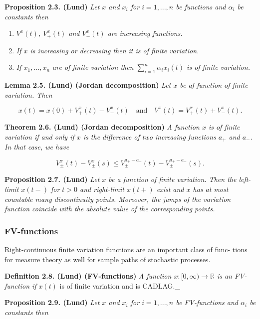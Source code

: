 \documentclass[a4paper,10pt,openany]{book}
\providecommand{\tightlist}{%
 \setlength{\itemsep}{0pt}\setlength{\parskip}{0pt}}
\begin{document}
\textbf{Proposition 2.3. (Lund)} \emph{Let \(x\) and \(x_i\) for \(i=1,...,n\) be functions and \(\alpha_i\) be constants then}

\begin{enumerate}
\def\labelenumi{\roman{enumi})}
\tightlist
\item
  \emph{\(V^x(t)\), \(V^x_+(t)\) and \(V^x_-(t)\) are increasing functions.}
\item
  \emph{If \(x\) is increasing or decreasing then it is of finite variation.}
\item
  \emph{If \(x_1,...,x_n\) are of finite variation then \(\sum_{i=1}^n\alpha_ix_i(t)\) is of finite variation.}
\end{enumerate}

\textbf{Lemma 2.5. (Lund) (Jordan decomposition)} \emph{Let \(x\) be af function of finite variation. Then}

\[
x(t)=x(0)+V_+^x(t)-V_-^x(t)\quad\text{and}\quad V^x(t)=V_+^x(t)+V_-^x(t).
\]

\textbf{Theorem 2.6. (Lund) (Jordan decomposition)} \emph{A function \(x\) is of finite variation if and only if \(x\) is the difference of two increasing functions \(a_+\) and \(a_-\). In that case, we have}

\[
V_{\pm}^x(t)-V_{\pm}^x(s)\le V_{\pm}^{a_+-a_-}(t)-V_{\pm}^{a_+-a_-}(s).
\]

\textbf{Proposition 2.7. (Lund)} \emph{Let \(x\) be a function of finite variation. Then the left-limit \(x(t-)\) for \(t>0\) and right-limit \(x(t+)\) exist and \(x\) has at most countable many discontinuity points. Moreover, the jumps of the variation function coincide with the absolute value of the corresponding points.}

\hypertarget{fv-functions}{%
\subsubsection{FV-functions}\label{fv-functions}}

Right-continuous finite variation functions are an important class of func- tions for measure theory as well for sample paths of stochastic processes.

\textbf{Definition 2.8. (Lund) (FV-functions)} \emph{A function \(x : [0,\infty) \to \mathbb R\) is an FV-function if }\(x(t)\) is of finite variation and is CADLAG.\_

\textbf{Proposition 2.9. (Lund)} \emph{Let \(x\) and \(x_i\) for \(i=1,...,n\) be FV-functions and \(\alpha_i\) be constants then}
\end{document}
